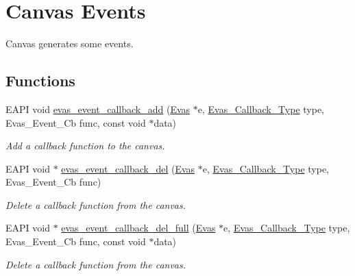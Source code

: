 \section{Canvas Events}
\label{group__Evas__Canvas__Events}


Canvas generates some events.  


\subsection*{Functions}
\begin{DoxyCompactItemize}
\item 
EAPI void \hyperlink{group__Evas__Canvas__Events_ga0388995a80e8951a532fbdc63ba26c71}{evas\_\-event\_\-callback\_\-add} (\hyperlink{group__Evas__Canvas_ga5ff87cc4ce6bc43e3b640a6d37f73043}{Evas} $\ast$e, \hyperlink{Evas_8h_a076b2a9b2de2b2144a4193b1d12ed448}{Evas\_\-Callback\_\-Type} type, Evas\_\-Event\_\-Cb func, const void $\ast$data)
\begin{DoxyCompactList}\small\item\em Add a callback function to the canvas. \item\end{DoxyCompactList}\item 
EAPI void $\ast$ \hyperlink{group__Evas__Canvas__Events_ga11a461d33617b022e490287e85217f5c}{evas\_\-event\_\-callback\_\-del} (\hyperlink{group__Evas__Canvas_ga5ff87cc4ce6bc43e3b640a6d37f73043}{Evas} $\ast$e, \hyperlink{Evas_8h_a076b2a9b2de2b2144a4193b1d12ed448}{Evas\_\-Callback\_\-Type} type, Evas\_\-Event\_\-Cb func)
\begin{DoxyCompactList}\small\item\em Delete a callback function from the canvas. \item\end{DoxyCompactList}\item 
EAPI void $\ast$ \hyperlink{group__Evas__Canvas__Events_ga84450d679e473b3ac84d4374f8936980}{evas\_\-event\_\-callback\_\-del\_\-full} (\hyperlink{group__Evas__Canvas_ga5ff87cc4ce6bc43e3b640a6d37f73043}{Evas} $\ast$e, \hyperlink{Evas_8h_a076b2a9b2de2b2144a4193b1d12ed448}{Evas\_\-Callback\_\-Type} type, Evas\_\-Event\_\-Cb func, const void $\ast$data)
\begin{DoxyCompactList}\small\item\em Delete a callback function from the canvas. \item\end{DoxyCompactList}\item 

\end{DoxyCompactItemize}
